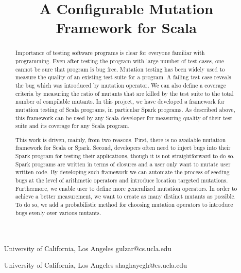 \documentclass[preprint]{sigplanconf}
\begin{document}
\setlength{\pdfpageheight}{\paperheight}
\setlength{\pdfpagewidth}{\paperwidth}



\title{A Configurable Mutation Framework for Scala}

           {University of California, Los Angeles}
           {gulzar@cs.ucla.edu}

           {University of California, Los Angeles}
           {shaghayegh@cs.ucla.edu}

\maketitle

\begin{abstract}
Importance of testing software programs is clear for everyone familiar with programming. Even after testing the program with large number of test cases, one cannot be sure that program is bug free. Mutation testing has been widely used to measure the quality of an existing test suite for a program.  A failing test case reveals the bug which was introduced by mutation operator. We can also define a coverage criteria by measuring the ratio of mutants that are killed by the test suite to the total number of compilable mutants. In this project, we have developed a framework for mutation testing of Scala programs, in particular Spark programs. As described above, this framework can be used by any Scala developer for measuring quality of their test suite and its coverage for any Scala program.

This work is driven, mainly, from two reasons. First, there is no available mutation framework for Scala or Spark. Second, developers often need to inject bugs into their Spark program for testing their applications, though it is not straightforward to do so. Spark programs are written in terms of closures and a user only want to mutate user written code. By developing such framework we can automate the process of seeding bugs at the level of arithmetic operators and introduce location targeted mutations. Furthermore, we enable user to define more generalized mutation operators. In order to achieve a better measurement, we want to create as many distinct mutants as possible. To do so, we add a probabilistic method for choosing mutation operators to introduce bugs evenly over various mutants. 
\end{abstract}
\end{document}
